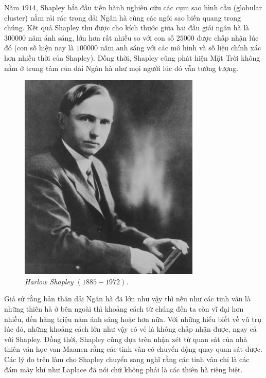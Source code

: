 \begin{multicols}{2}
	\vskip 0.1cm
	Năm $1914$, Shapley bắt đầu tiến hành nghiên cứu các cụm sao hình cầu (globular cluster) nằm rải rác trong dải Ngân hà cùng các ngôi sao biến quang trong chúng. Kết quả Shapley thu được cho kích thước giữa hai đầu giải ngân hà là $300000$ năm ánh sáng, lớn hơn rất nhiều so với con số $25000$ được chấp nhận lúc đó (con số hiện nay là $100 000$ năm anh sáng với các mô hình và số liệu chính xác hơn nhiều thời của Shapley). Đồng thời, Shapley cũng phát hiện Mặt Trời không nằm ở trung tâm của dải Ngân hà như mọi người lúc đó vẫn tưởng tượng.
	\begin{figure}[H]
		\vspace*{-5pt}
		\centering
		\captionsetup{labelformat= empty, justification=centering}
		\includegraphics[width= 1\linewidth]{8}
		\caption{\small\textit{\color{timhieukhoahoc}Harlow Shapley $(1885 - 1972)$.}}
		\vspace*{-10pt}
	\end{figure}
	Giả sử rằng bản thân dải Ngân hà đã lớn như vậy thì nếu như các tinh vân là những thiên hà ở bên ngoài thì khoảng cách từ chúng đến ta còn vĩ đại hơn nhiều, đến hàng triệu năm ánh sáng hoặc hơn nữa. Với những hiểu biết về vũ trụ lúc đó, những khoảng cách lớn như vậy có vẻ là không chấp nhận được, ngay cả với Shapley. Đồng thời, Shapley cũng dựa trên nhận xét từ quan sát của nhà thiên văn học van Maanen rằng các tinh vân có chuyển động quay quan sát được. Các lý do trên làm cho Shapley chuyển sang nghĩ rằng các tinh vân chỉ là các đám mây khí như Laplace đã nói chứ không phải là các thiên hà riêng biệt.

\end{multicols}
